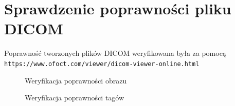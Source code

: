 \documentclass[a4paper]{article}
\begin{document}
\section{Sprawdzenie poprawności pliku DICOM}
Poprawność tworzonych plików DICOM weryfikowana była za pomocą \\ \texttt{https://www.ofoct.com/viewer/dicom-viewer-online.html}
\begin{figure}[H]
    \caption{Weryfikacja poprawności obrazu}
\end{figure}
\begin{figure}[H]
    \caption{Weryfikacja poprawności tagów}
\end{figure}
\end{document}
